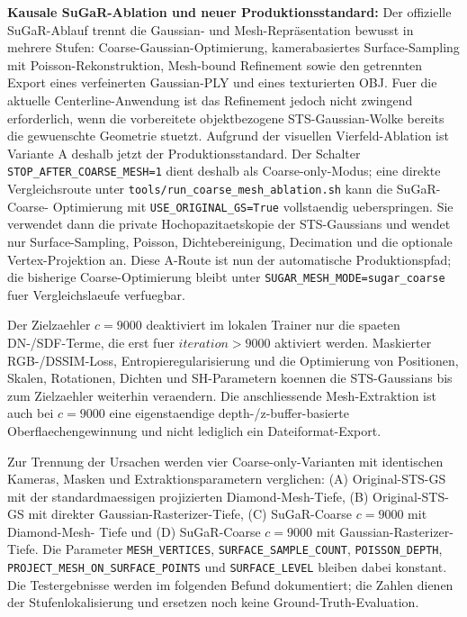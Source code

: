 \documentclass[12pt,a4paper]{article}
\begin{document}
\textbf{Kausale SuGaR-Ablation und neuer Produktionsstandard:} Der offizielle SuGaR-Ablauf
trennt die Gaussian- und Mesh-Repräsentation bewusst in mehrere Stufen:
Coarse-Gaussian-Optimierung, kamerabasiertes Surface-Sampling mit
Poisson-Rekonstruktion, Mesh-bound Refinement sowie den getrennten Export eines
verfeinerten Gaussian-PLY und eines texturierten OBJ. Fuer die aktuelle
Centerline-Anwendung ist das Refinement jedoch nicht zwingend erforderlich,
wenn die vorbereitete objektbezogene STS-Gaussian-Wolke bereits die gewuenschte
Geometrie stuetzt. Aufgrund der visuellen Vierfeld-Ablation ist Variante A
deshalb jetzt der Produktionsstandard. Der Schalter
\texttt{STOP\_AFTER\_COARSE\_MESH=1} dient deshalb als Coarse-only-Modus;
eine direkte Vergleichsroute unter
\texttt{tools/run\_coarse\_mesh\_ablation.sh} kann die SuGaR-Coarse-
Optimierung mit \texttt{USE\_ORIGINAL\_GS=True} vollstaendig ueberspringen.
Sie verwendet dann die private Hochopazitaetskopie der STS-Gaussians und
wendet nur Surface-Sampling, Poisson, Dichtebereinigung, Decimation und die
optionale Vertex-Projektion an. Diese A-Route ist nun der automatische
Produktionspfad; die bisherige Coarse-Optimierung bleibt unter
\texttt{SUGAR\_MESH\_MODE=sugar\_coarse} fuer Vergleichslaeufe verfuegbar.

Der Zielzaehler $c=9000$ deaktiviert im lokalen Trainer nur die spaeten
DN-/SDF-Terme, die erst fuer $iteration>9000$ aktiviert werden. Maskierter
RGB-/DSSIM-Loss, Entropieregularisierung und die Optimierung von Positionen,
Skalen, Rotationen, Dichten und SH-Parametern koennen die STS-Gaussians bis
zum Zielzaehler weiterhin veraendern. Die anschliessende Mesh-Extraktion ist
auch bei $c=9000$ eine eigenstaendige depth-/z-buffer-basierte
Oberflaechengewinnung und nicht lediglich ein Dateiformat-Export.

Zur Trennung der Ursachen werden vier Coarse-only-Varianten mit identischen
Kameras, Masken und Extraktionsparametern verglichen: (A) Original-STS-GS mit
der standardmaessigen projizierten Diamond-Mesh-Tiefe, (B) Original-STS-GS mit
direkter Gaussian-Rasterizer-Tiefe, (C) SuGaR-Coarse $c=9000$ mit Diamond-Mesh-
Tiefe und (D) SuGaR-Coarse $c=9000$ mit Gaussian-Rasterizer-Tiefe. Die
Parameter \texttt{MESH\_VERTICES}, \texttt{SURFACE\_SAMPLE\_COUNT},
\texttt{POISSON\_DEPTH}, \texttt{PROJECT\_MESH\_ON\_SURFACE\_POINTS} und
\texttt{SURFACE\_LEVEL} bleiben dabei konstant. Die Testergebnisse werden im
folgenden Befund dokumentiert; die Zahlen dienen der Stufenlokalisierung und
ersetzen noch keine Ground-Truth-Evaluation.
\end{document}

